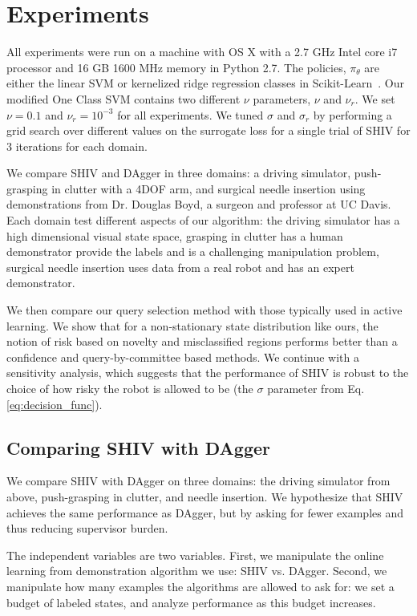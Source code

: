 \documentclass[10pt, conference]{ieeeconf}      %
\begin{document}
\section{Experiments}

All experiments were run on a machine with OS X with a 2.7 GHz Intel core i7 processor and 16 GB
1600 MHz memory in Python 2.7. The policies, $\pi_\theta$ are either the linear SVM or  kernelized ridge regression classes in Scikit-Learn~\cite{scikit-learn}. Our modified One Class SVM contains two different $\nu$ parameters, $\nu$ and $\nu_r$. We set $\nu = 0.1$ and $\nu_r =10^{-3}$ for all experiments. We tuned $\sigma$ and $\sigma_r$ by performing a grid search over different values on the surrogate loss for a single trial of SHIV for 3 iterations for each domain.

We compare SHIV and DAgger in three domains: a driving simulator, push-grasping in clutter with a 4DOF arm, and surgical needle insertion using demonstrations from Dr. Douglas Boyd, a surgeon and professor at UC Davis. Each domain test different aspects of our algorithm: the driving simulator has a high dimensional visual state space, grasping in clutter has a human demonstrator provide the labels and is a challenging manipulation problem, surgical needle insertion uses data from a real robot and has an expert demonstrator. 

We then  compare our query selection method with those typically used in active learning. We show that for a non-stationary state distribution like ours, the notion of risk based on novelty and misclassified regions performs better than a confidence and query-by-committee based methods. We continue with a sensitivity analysis, which suggests that the performance of SHIV is robust to the choice of how risky the robot is allowed to be (the $\sigma$ parameter from Eq. \ref{eq:decision_func}).




\subsection{Comparing SHIV with DAgger}
We compare SHIV with DAgger on three domains: the driving simulator from above, push-grasping in clutter, and needle insertion. We hypothesize that SHIV achieves the same performance as DAgger, but by asking for fewer examples and thus reducing supervisor burden.

The independent variables are two variables. First, we manipulate the online learning from demonstration algorithm we use: SHIV vs. DAgger. Second, we manipulate how many examples the algorithms are allowed to ask for: we set a budget of labeled states, and analyze performance as this budget increases.
\end{document}
